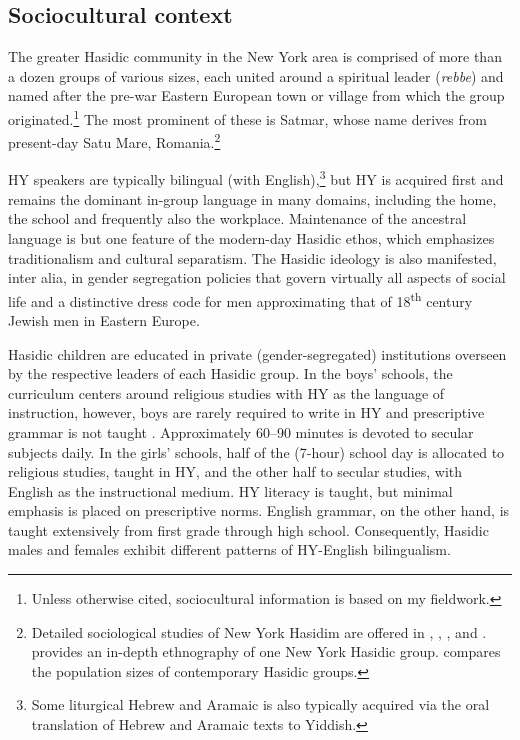 \documentclass[output=paper]{langsci/langscibook}
\begin{document}
 
\subsection{Sociocultural context}
\label{sec:nove:2.2}


The greater Hasidic community in the New York area is comprised of more than a dozen groups of various sizes, each united around a spiritual leader (\textit{rebbe}) and named after the pre-war Eastern European town or village from which the group originated.\footnote{Unless otherwise cited, sociocultural information is based on my fieldwork.} The most prominent of these is Satmar, whose name derives from present-day Satu Mare, Romania.\footnote{Detailed sociological studies of New York Hasidim are offered in \citet{Heilman1992, Heilman2017}, \citet{Kranzler1995}, \citet{Poll1962}, and \citet{Rubin1972, Rubin1997}. \citet{Fader2009} provides an in-depth ethnography of one New York Hasidic group. \citet{Wodzinski2018} compares the population sizes of contemporary Hasidic groups.} 

HY speakers are typically bilingual (with English),\footnote{Some liturgical Hebrew and Aramaic is also typically acquired via the oral translation of Hebrew and Aramaic texts to Yiddish.} but HY is acquired first and remains the dominant in-group language in many domains, including the home, the school and frequently also the workplace. Maintenance of the ancestral language is but one feature of the modern-day Hasidic ethos, which emphasizes traditionalism and cultural separatism. The Hasidic ideology is also manifested, inter alia, in gender segregation policies that govern virtually all aspects of social life and a distinctive dress code for men approximating that of 18\textsuperscript{th} century Jewish men in Eastern Europe.
 
 
Hasidic children are educated in private (gender-segregated) institutions overseen by the respective leaders of each Hasidic group. In the boys’ schools, the curriculum centers around religious studies with HY as the language of instruction, however, boys are rarely required to write in HY and prescriptive grammar is not taught \citep{Bleaman2018}. Approximately 60--90 minutes is devoted to secular subjects daily. In the girls’ schools, half of the (7-hour) school day is allocated to religious studies, taught in HY, and the other half to secular studies, with English as the instructional medium. HY literacy is taught, but minimal emphasis is placed on prescriptive norms. English grammar, on the other hand, is taught extensively from first grade through high school. Consequently, Hasidic males and females exhibit different patterns of HY-English bilingualism. 
 
\end{document}
